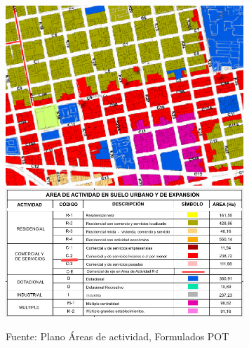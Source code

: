 \documentclass[12pt,a4paper,twoside]{article}
\begin{document}
\begin{figure}[!h]
	\centering
	\includegraphics[width=0.8\textwidth]{Norma/AreaAc}
	\includegraphics[width=0.8\textwidth]{Norma/AreaAcL}
	\caption{Fuente: Plano Áreas de actividad, Formulados POT}
	\label{fig:Usos}
\end{figure}

%
%
\end{document}
